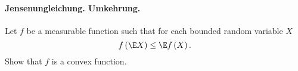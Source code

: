 

\paragraph{Jensenungleichung. Umkehrung. } Let $f$ be a measurable function 
such that for each bounded random variable $X$ 
\begin{equation*}
    f \left( \E X \right) \leq \E f\left( X \right).
\end{equation*}
Show that $f$ is a convex function.


